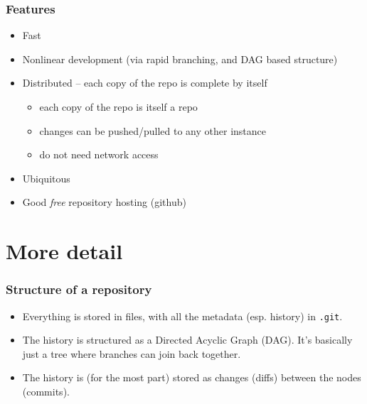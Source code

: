 \documentclass{beamer}
\begin{document}
\begin{frame}
    \frametitle{Features}
    \begin{itemize}
        \item Fast
        \item Nonlinear development (via rapid branching, and DAG based structure)
        \item Distributed -- each copy of the repo is complete by itself
            \begin{itemize}
                \item each copy of the repo is itself a repo
                \item changes can be pushed/pulled to any other instance
                \item do not need network access
            \end{itemize}
        \item Ubiquitous
        \item Good \emph{free} repository hosting (github)
    \end{itemize}
\end{frame}

\section{More detail}


\begin{frame}
    \frametitle{Structure of a repository}
    \begin{itemize}
        \item Everything is stored in files, with all the metadata (esp. history) in \texttt{.git}.
        \item The history is structured as a Directed Acyclic Graph (DAG). It's basically just a tree where branches can join back together.
        \item The history is (for the most part) stored as changes (diffs) between the nodes (commits). 
    \end{itemize}
\end{frame}

\end{document}
